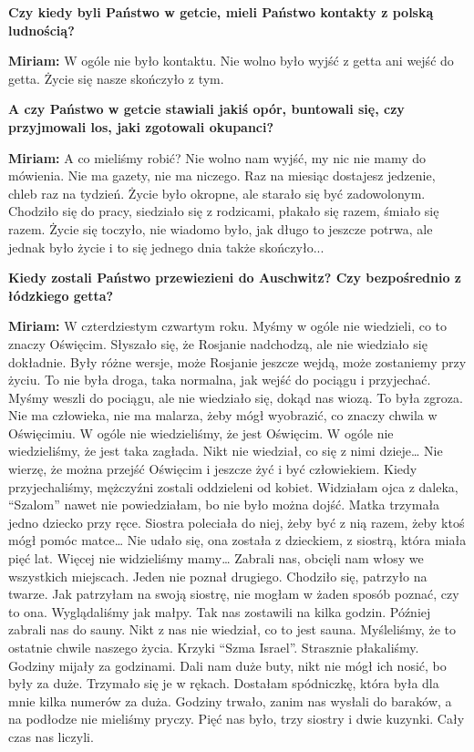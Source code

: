 \textbf{Czy kiedy byli Państwo w getcie, mieli Państwo kontakty z polską ludnością?} 

\textbf{Miriam:} W ogóle nie było kontaktu. Nie wolno było wyjść z getta ani wejść do getta. Życie się nasze skończyło z tym.

\textbf{A czy Państwo w getcie stawiali jakiś opór, buntowali się, czy przyjmowali los, jaki zgotowali okupanci?} 

\textbf{Miriam:} A co mieliśmy robić? Nie wolno nam wyjść, my nic nie mamy do mówienia. Nie ma gazety, nie ma niczego. Raz na miesiąc dostajesz jedzenie, chleb raz na tydzień. Życie było okropne, ale starało się być zadowolonym. Chodziło się do pracy, siedziało się z rodzicami, płakało się razem, śmiało się razem. Życie się toczyło, nie wiadomo było, jak długo to jeszcze potrwa, ale jednak było życie i to się jednego dnia także skończyło... 

\textbf{Kiedy zostali Państwo przewiezieni do Auschwitz? Czy bezpośrednio z łódzkiego getta? }

\textbf{Miriam:} W czterdziestym czwartym roku. Myśmy w ogóle nie wiedzieli, co to znaczy Oświęcim. Słyszało się, że Rosjanie nadchodzą, ale nie wiedziało się dokładnie. Były różne wersje, może Rosjanie jeszcze wejdą, może zostaniemy przy życiu. To nie była droga, taka normalna, jak wejść do pociągu i przyjechać. Myśmy weszli do pociągu, ale nie wiedziało się, dokąd nas wiozą. To była zgroza. Nie ma człowieka, nie ma malarza, żeby mógł wyobrazić, co znaczy chwila w Oświęcimiu. W ogóle nie wiedzieliśmy, że jest Oświęcim. W ogóle nie wiedzieliśmy, że jest taka zagłada. Nikt nie wiedział, co się z nimi dzieje… Nie wierzę, że można przejść Oświęcim i jeszcze żyć i być człowiekiem. Kiedy przyjechaliśmy, mężczyźni zostali oddzieleni od kobiet. Widziałam ojca z daleka, "`Szalom"' nawet nie powiedziałam, bo nie było można dojść. Matka trzymała jedno dziecko przy ręce. Siostra poleciała do niej, żeby być z nią razem, żeby ktoś mógł pomóc matce… Nie udało się, ona została z dzieckiem, z siostrą, która miała pięć lat. Więcej nie widzieliśmy mamy… Zabrali nas, obcięli nam włosy we wszystkich miejscach. Jeden nie poznał drugiego. Chodziło się, patrzyło na twarze. Jak patrzyłam na swoją siostrę, nie mogłam w żaden sposób poznać, czy to ona. Wyglądaliśmy jak małpy. Tak nas zostawili na kilka godzin. Później zabrali nas do sauny. Nikt z nas nie wiedział, co to jest sauna. Myśleliśmy, że to ostatnie chwile naszego życia. Krzyki "`Szma Israel"'. Strasznie płakaliśmy. Godziny mijały za godzinami. Dali nam duże buty, nikt nie mógł ich nosić, bo były za duże. Trzymało się je w rękach. Dostałam spódniczkę, która była dla mnie kilka numerów za duża. Godziny trwało, zanim nas wysłali do baraków, a na podłodze nie mieliśmy pryczy. Pięć nas było, trzy siostry i dwie kuzynki. Cały czas nas liczyli. 

